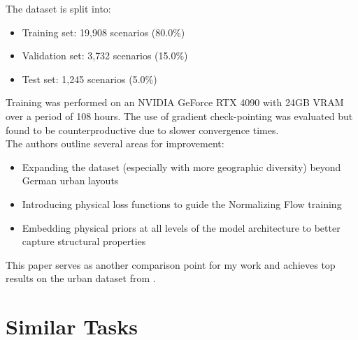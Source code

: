 			The dataset is split into:
			\begin{itemize}[itemsep=1mm, parsep=0pt]
				\item Training set: 19{,}908 scenarios (80.0\%)
				\item Validation set: 3{,}732 scenarios (15.0\%)
				\item Test set: 1{,}245 scenarios (5.0\%)
			\end{itemize}
			Training was performed on an NVIDIA GeForce RTX 4090 with 24GB VRAM over a period of 108 hours. The use of gradient check-pointing was evaluated but found to be counterproductive due to slower convergence times.\\
			The authors outline several areas for improvement:
			\begin{itemize}[itemsep=1mm, parsep=0pt]
				\item Expanding the dataset (especially with more geographic diversity) beyond German urban layouts
				\item Introducing physical loss functions to guide the Normalizing Flow training
				\item Embedding physical priors at all levels of the model architecture to better capture structural properties
			\end{itemize}
			This paper serves as another comparison point for my work and achieves top results on the urban dataset from \cite{spitznagel_urban_2024-1}.
		
		
	\newpage
	\section{Similar Tasks}
	\label{sec:lit-similar}
		
